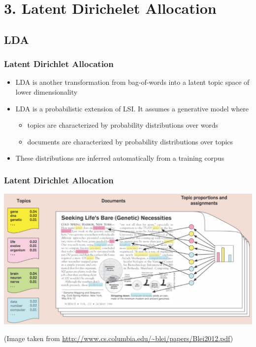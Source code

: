 \documentclass{beamer}
\begin{document}
\section{3. Latent Dirichelet Allocation}
\subsection{LDA}


\begin{frame}

    \frametitle{Latent Dirichlet Allocation}

	\begin{itemize}
	    \item LDA is another transformation from bag-of-words into a latent topic space of lower dimensionality
	    \vspace{.3cm}
	   \item LDA is a probabilistic extension of LSI. It assumes a generative model where
	    \begin{itemize}
	        \item topics are characterized by probability distributions over words
	        \item documents are characterized by probability distributions over topics
	    \end{itemize}
	   \vspace{.3cm}
	   \item These distributions are inferred automatically from a training corpus
	\end{itemize}

\end{frame}


\begin{frame}

    \frametitle{Latent Dirichlet Allocation}

	\centerline{\includegraphics[width=\textwidth]{./figs/NLPTM_LDA.png}}
\tiny	
(Image taken from \url{http://www.cs.columbia.edu/~blei/papers/Blei2012.pdf})

\end{frame}
\end{document}
